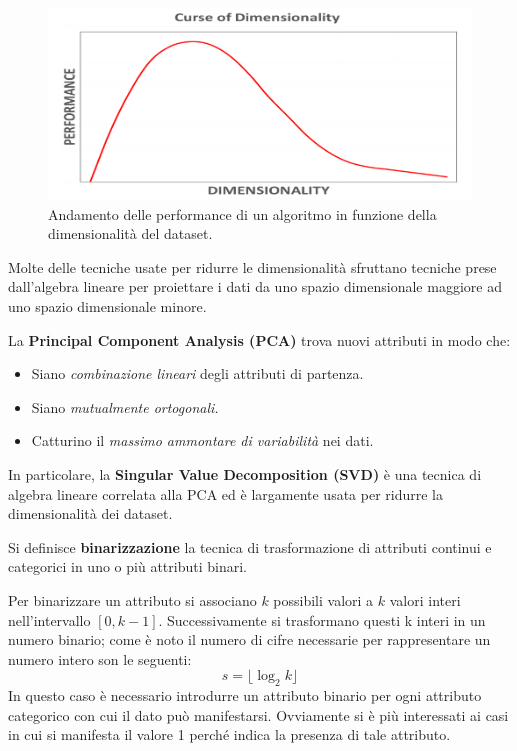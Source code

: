 \begin{figure}[H]
	\centering
	\includegraphics[height=0.35 \linewidth]{introduction/pict/performance.png}
	\caption{Andamento delle performance di un algoritmo in funzione della dimensionalità del dataset.}
\end{figure}

Molte delle tecniche usate per ridurre le dimensionalità sfruttano tecniche prese dall'algebra lineare per proiettare i dati da uno spazio dimensionale maggiore ad uno spazio dimensionale minore.

La \textbf{Principal Component Analysis (PCA)} trova nuovi attributi in modo che:
\begin{itemize}
	\item Siano \textit{combinazione lineari} degli attributi di partenza.
	\item Siano \textit{mutualmente ortogonali.}
	\item Catturino il \textit{massimo ammontare di variabilità} nei dati.
\end{itemize}

In particolare, la \textbf{Singular Value Decomposition (SVD)} è una tecnica di algebra lineare correlata alla PCA ed è largamente usata per ridurre la dimensionalità dei dataset.

\begin{defn}
	Si definisce \textbf{binarizzazione} la tecnica di trasformazione di attributi continui e categorici in uno o più attributi binari.
\end{defn}
Per binarizzare un attributo si associano $k$ possibili valori a $k$ valori interi nell'intervallo $[0, k-1]$. Successivamente si trasformano questi k interi in un numero binario; come è noto il numero di cifre necessarie per rappresentare un numero intero son le seguenti:
\[s = \lfloor \log_{2}k \rfloor\] 
 In questo caso è necessario introdurre un attributo binario per ogni attributo categorico con cui il dato può manifestarsi. Ovviamente si è più interessati ai casi in cui si manifesta il valore 1 perché indica la presenza di tale attributo.

